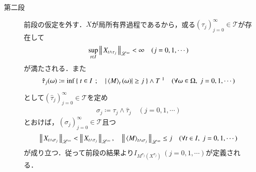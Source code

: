 \begin{prf}
\begin{description}
			\item[第二段]
				前段の仮定を外す．$X$が局所有界過程であるから，或る$(\tau_j)_{j=0}^{\infty} \in \mathcal{T}$が存在して
				\begin{align}
					\operatorname*{sup}_{t \in I} \left\|\, X_{t \wedge \tau_j}\, \right\|_{\mathscr{L}^\infty} < \infty
					\quad (j=0,1,\cdots)
				\end{align}
				が満たされる．また
				\begin{align}
					\hat{\tau}_j(\omega) \coloneqq
					\inf{}{\Set{t \in I}{|\inprod<M>_t(\omega)| \geq j}} \wedge T\ \footnotemark
					\quad (\forall \omega \in \Omega,\ j=0,1,\cdots)
				\end{align}
				として$\left( \hat{\tau}_j \right)_{j=0}^{\infty} \in \mathcal{T}$を定め
				\begin{align}
					\sigma_j \coloneqq \tau_j \wedge \hat{\tau}_j
					\quad (j=0,1,\cdots)
				\end{align}
				とおけば，$(\sigma_j)_{j=0}^{\infty} \in \mathcal{T}$且つ
				\begin{align}
					\Norm{X_{t \wedge \sigma_j}}{\mathscr{L}^\infty} < \Norm{X_{t \wedge \tau_j}}{\mathscr{L}^\infty},
					\quad \Norm{\inprod<M>_{t \wedge \sigma_j}}{\mathscr{L}^\infty} \leq j
					\quad (\forall t \in I,\ j=0,1,\cdots)
				\end{align}
				が成り立つ．従って前段の結果より$I_{M^{\sigma_j}(X^{\sigma_j})}\ (j=0,1,\cdots)$が定義される．
		\end{description}
		\QED
	\end{prf}
	